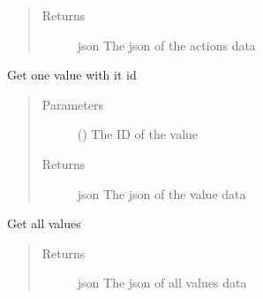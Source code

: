 \documentclass[letterpaper,10pt,english]{sphinxmanual}
\begin{document}
\begin{fulllineitems}
\begin{fulllineitems}
\begin{quote}
\begin{description}
\item[{Returns}] \leavevmode
\sphinxAtStartPar
json \textendash{} The json of the actions data

\end{description}\end{quote}

\end{fulllineitems}


\begin{fulllineitems}
\label{\detokenize{index:Api.Api.get_value_by_id}}
\sphinxAtStartPar
Get one value with it id
\begin{quote}\begin{description}
\item[{Parameters}] \leavevmode
\sphinxAtStartPar
{} () \textendash{} The ID of the value

\item[{Returns}] \leavevmode
\sphinxAtStartPar
json \textendash{} The json of the value data

\end{description}\end{quote}

\end{fulllineitems}


\begin{fulllineitems}
\label{\detokenize{index:Api.Api.get_values}}
\sphinxAtStartPar
Get all values
\begin{quote}\begin{description}
\item[{Returns}] \leavevmode
\sphinxAtStartPar
json \textendash{} The json of all values data

\end{description}\end{quote}

\end{fulllineitems}



\end{fulllineitems}
\end{document}
